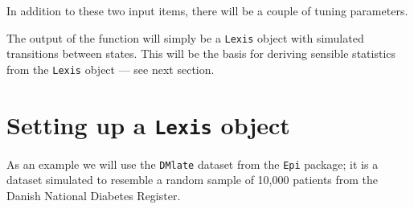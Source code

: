 \documentclass[a4paper,twoside,12pt]{report}
\begin{document}
In addition to these two input items, there will be a couple of tuning
parameters.

The output of the function will simply be a \texttt{Lexis} object with
simulated transitions between states. This will be the basis for
deriving sensible statistics from the \texttt{Lexis} object --- see
next section.

\section{Setting up a \texttt{Lexis} object}

As an example we will use the \texttt{DMlate} dataset from the
\texttt{Epi} package; it is a dataset simulated to resemble a random
sample of 10,000 patients from the Danish National Diabetes Register.
\end{document}
